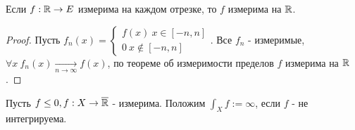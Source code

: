 \begin{statement*}
    Если $f:\mathbb{R} \to E$ измерима на каждом отрезке, то $f$ измерима на $\mathbb{R}$. 
    \begin{proof}
        Пусть $f_n(x) = \begin{cases*}
            f(x) \ x \in \left[-n, n\right] \\
            0 \ x \notin \left[-n, n\right]
        \end{cases*}$. Все $f_n$ - измеримые, $\forall x \ f_n(x) \underset{n \to \infty}{\to} f(x)$, по теореме об измеримости пределов $f$ измерима на $\mathbb{R}$.
    \end{proof}
\end{statement*}

\begin{definition*}
    Пусть $f \le 0, f:X \to \overline{\mathbb{R}}$ - измерима. Положим $\int_X f:= \infty$, если $f$ - не интегрируема.
\end{definition*}

